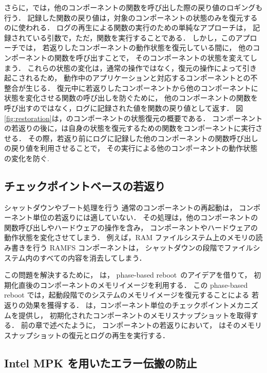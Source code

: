さらに，\sysname では，他のコンポーネントの関数を呼び出した際の戻り値のロギングも行う．
記録した関数の戻り値は，対象のコンポーネントの状態のみを復元するのに使われる．
ログの再生による関数の実行のための単純なアプローチは，
記録されている引数で，ただ，関数を実行することである．
しかし，このアプローチでは，
若返りしたコンポーネントの動作状態を復元している間に，
他のコンポーネントの関数を呼び出すことで，
そのコンポーネントの状態を変えてしまう．
これらの状態の変化は，通常の操作ではなく，復元の操作によって引き起こされるため，
動作中のアプリケーションと対応するコンポーネントとの不整合が生じる．
復元中に若返りしたコンポーネントから他のコンポーネントに状態を変化させる関数の呼び出しを防ぐために，
他のコンポーネントの関数を呼び出すのではなく，ログに記録された値を関数の戻り値として返す．
図\ref{fig:restoration}は，\sysname のコンポーネントの状態復元の概要である．
コンポーネントの若返りの後に，\sysname は自身の状態を復元するための関数をコンポーネントに実行させる．
その際，若返り前にログに記録した他のコンポーネントの関数呼び出しの戻り値を利用させることで，
その実行による他のコンポーネントの動作状態の変化を防ぐ.



\subsection{チェックポイントベースの若返り}

シャットダウンやブート処理を行う
通常のコンポーネントの再起動は，
コンポーネント単位の若返りには適していない．
その処理は，他のコンポーネントの関数呼び出しやハードウェアの操作を含み，
コンポーネントやハードウェアの動作状態を変化させてしまう．
例えば，RAM ファイルシステム上のメモリの読み書きを行う RAMFS コンポーネントは，
シャットダウンの段階でファイルシステム内のすべての内容を消去してしまう．

この問題を解決するために，
\sysname は，
phase-based reboot~\cite{YamakitaEtAl-PBR}のアイデアを借りて，
初期化直後のコンポーネントのメモリイメージを利用する．
この phase-based reboot では，起動段階でのシステムのメモリイメージを復元することによる
若返りの効果を獲得する．
\sysname は，コンポーネント単位のチェックポイントメカニズムを提供し，
初期化されたコンポーネントのメモリスナップショットを取得する．
前の章で述べたように，
コンポーネントの若返りにおいて，
\sysname はそのメモリスナップショットの復元とログの再生を実行する．


\subsection{Intel MPK を用いたエラー伝搬の防止}

